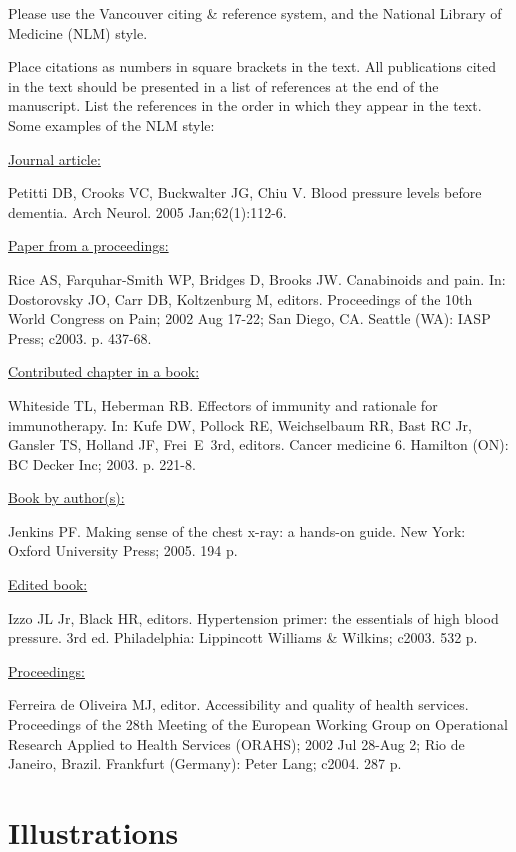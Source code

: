\documentclass{IOS-Book-Article}
\begin{document}
Please use the Vancouver citing \& reference system, and the National Library of 
Medicine (NLM) style.

Place citations as numbers in square brackets in the text. All publications cited in 
the text should be presented in a list of references at the end of the manuscript. 
List the references in the order in which they appear in the text. Some examples of 
the NLM style:

\medskip
\noindent\ul{Journal article:}\par\noindent
Petitti DB, Crooks VC, Buckwalter JG, Chiu V. Blood pressure levels before dementia. 
Arch Neurol. 2005 Jan;62(1):112-6.

\medskip
\noindent\ul{Paper from a proceedings:}\par\noindent
Rice AS, Farquhar-Smith WP, Bridges D, Brooks JW. Canabinoids and pain. In: Dostorovsky 
JO, Carr DB, Koltzenburg M, editors. Proceedings of the 10th World Congress on Pain; 
2002 Aug 17-22; San Diego, CA. Seattle (WA): IASP Press; c2003. p. 437-68.

\medskip
\noindent\ul{Contributed chapter in a book:}\par\noindent
Whiteside TL, Heberman RB. Effectors of immunity and rationale for immunotherapy. In: 
Kufe DW, Pollock RE, Weichselbaum RR, Bast RC Jr, Gansler TS, Holland JF, Frei~E~3rd, 
editors. Cancer medicine 6. Hamilton (ON): BC Decker Inc; 2003. p. 221-8.

\medskip
\noindent\ul{Book by author(s):}\par\noindent
Jenkins PF. Making sense of the chest x-ray: a hands-on guide. New York: Oxford 
University Press; 2005. 194 p.

\medskip
\noindent\ul{Edited book:}\par\noindent
Izzo JL Jr, Black HR, editors. Hypertension primer: the essentials of high blood pressure. 
3rd ed. Philadelphia: Lippincott Williams \& Wilkins; c2003. 532 p.

\medskip
\noindent\ul{Proceedings:}\par\noindent
Ferreira de Oliveira MJ, editor. Accessibility and quality of health services. Proceedings of 
the 28th Meeting of the European Working Group on Operational Research Applied to Health 
Services (ORAHS); 2002 Jul 28-Aug 2; Rio de Janeiro, Brazil. Frankfurt (Germany): Peter Lang; 
c2004. 287 p.

\section{Illustrations}
\end{document}

